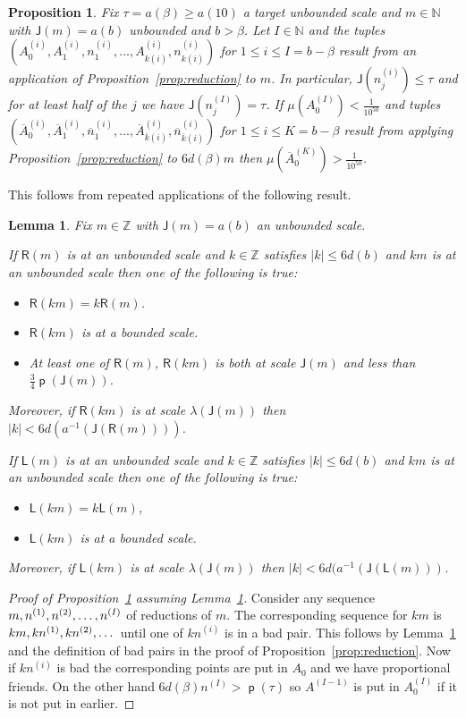 \documentclass[10pt]{amsart}
\newtheorem{lemm}[theo]{Lemma}\newtheorem{prop}[theo]{Proposition}\newtheorem{coro}[theo]{Corollary}\newtheorem{conj}[theo]{Conjecture}
\theoremstyle{definition}\newtheorem{defi}[theo]{Definition}\newtheorem{rema}[theo]{Remark}\newtheorem{exam}[theo]{Example}\newtheorem{exem}[theo]{Example}\newtheorem{nota}[theo]{Notation}
\DeclareMathOperator{\p}{\mathsf{p}}
\newcommand{\N}{\mathbb{N}}
\newcommand{\Z}{\mathbb{Z}}
\newcommand{\lft}{\mathsf{L}}
\newcommand{\rht}{\mathsf{R}}
\newcommand{\scl}{\mathsf{J}}
\begin{document}
\begin{prop}\label{prop:reduction multiples}
Fix $\tau=a(\beta) \ge a(10)$ a target unbounded scale and $m \in \N$ with $\scl(m)=a(b)$ unbounded and $b>\beta$. Let $I \in \N$ and the tuples $(A^{(i)}_0, A^{(i)}_1, n^{(i)}_1,\dots, A^{(i)}_{k(i)}, n^{(i)}_{k(i)})$ for $1 \le i \le I=b-\beta$ result from an application of Proposition~\ref{prop:reduction} to $m$. In particular, $\scl(n_j^{(i)}) \leq \tau$ and for at least half of the $j$ we have $\scl(n_j^{(I)})=\tau$. If $\mu(A^{(I)}_0)<\frac 1 {10^{50}}$ and tuples $(\overline{A}^{(i)}_0, \overline{A}^{(i)}_1, \overline{n}^{(i)}_1,\dots, \overline{A}^{(i)}_{\overline{k}(i)}, \overline{n}^{(i)}_{\overline{k}(i)})$ for $1 \le i \le K = b-\beta$ result from applying Proposition~\ref{prop:reduction} to $6d(\beta) m$ then $\mu(\overline{A}^{(K)}_0)>\frac 1 {10^{50}}$.
\end{prop}

This follows from repeated applications of the following result.

\begin{lemm}\label{lem:reduc multiply}
Fix $m \in \Z$ with $\scl(m) = a(b)$ an unbounded scale.

If $\rht(m)$ is at an unbounded scale and $k \in \Z$ satisfies $|k|\leq 6d(b)$ and $km$ is at an unbounded scale then one of the following is true:
\begin{itemize}
\item $\rht(km)=k\rht(m)$.
\item $\rht(km)$ is at a bounded scale.
\item At least one of $\rht(m)$, $\rht(km)$ is both at scale $\scl(m)$ and less than $\frac{3}{4} \p(\scl(m))$.
\end{itemize}
Moreover, if $\rht(km)$ is at scale $\lambda(\scl(m))$ then $|k| < 6d(a^{-1}(\scl(\rht(m))))$.

\pagebreak
If $\lft(m)$ is at an unbounded scale and $k \in \Z$ satisfies $|k|\leq 6d(b)$ and $km$ is at an unbounded scale then one of the following is true:
\begin{itemize}
\item $\lft(km) = k\lft(m)$,
\item $\lft(km)$ is at a bounded scale.
\end{itemize}
Moreover, if $\lft(km)$ is at scale $\lambda(\scl(m))$ then $|k| < 6d(a^{-1}(\scl(\lft(m)))$.
\end{lemm}
\begin{proof}[Proof of Proposition~\ref{prop:reduction multiples} assuming Lemma~\ref{lem:reduc multiply}]
Consider any sequence $m, n^{(1)},\linebreak n^{(2)},\dots,n^{(I)}$ of reductions of $m$. The corresponding sequence for $km$ is $km,kn^{(1)},\linebreak kn^{(2)},\dots$ until one of $kn^{(i)}$ is in a bad pair. This follows by Lemma~\ref{lem:reduc multiply} and the definition of bad pairs in the proof of Proposition~\ref{prop:reduction}. Now if $kn^{(i)}$ is bad the corresponding points are put in $A_0$ and we have proportional friends. On the other hand $6d(\beta) n^{(I)} > \p(\tau)$ so $A^{(I-1)}$ is put in $A_0^{(I)}$ if it is not put in earlier.
\end{proof}
\end{document}
